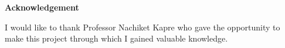 
\thispagestyle{plain}
\begin{center}
    \textbf{Acknowledgement}
\end{center}
 
I would like to thank Professor Nachiket Kapre who gave the opportunity to make this project through which I gained valuable knowledge.